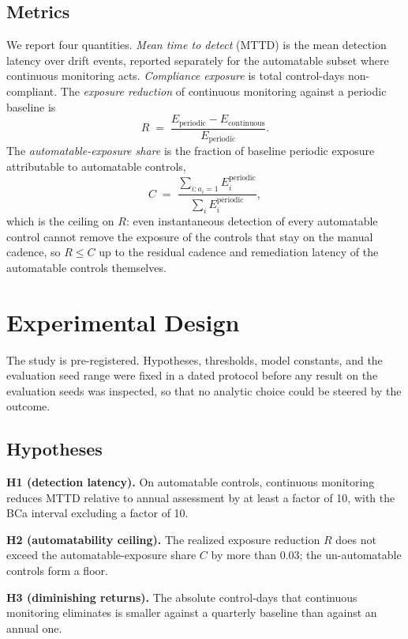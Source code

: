 \documentclass[journal]{IEEEtran}
\begin{document}
\subsection{Metrics}
We report four quantities. \emph{Mean time to detect} (MTTD) is the mean detection latency over
drift events, reported separately for the automatable subset where continuous monitoring acts.
\emph{Compliance exposure} is total control-days non-compliant. The \emph{exposure reduction} of
continuous monitoring against a periodic baseline is
\begin{equation}
R \;=\; \frac{E_{\text{periodic}} - E_{\text{continuous}}}{E_{\text{periodic}}}.
\end{equation}
The \emph{automatable-exposure share} is the fraction of baseline periodic exposure attributable to
automatable controls,
\begin{equation}
C \;=\; \frac{\sum_{i : a_i = 1} E_i^{\text{periodic}}}{\sum_{i} E_i^{\text{periodic}}},
\end{equation}
which is the ceiling on $R$: even instantaneous detection of every automatable control cannot remove
the exposure of the controls that stay on the manual cadence, so $R \le C$ up to the residual
cadence and remediation latency of the automatable controls themselves.

\section{Experimental Design}
The study is pre-registered. Hypotheses, thresholds, model constants, and the evaluation seed range
were fixed in a dated protocol before any result on the evaluation seeds was inspected, so that no
analytic choice could be steered by the outcome.

\subsection{Hypotheses}
\textbf{H1 (detection latency).} On automatable controls, continuous monitoring reduces MTTD
relative to annual assessment by at least a factor of 10, with the BCa interval excluding a factor
of 10.

\textbf{H2 (automatability ceiling).} The realized exposure reduction $R$ does not exceed the
automatable-exposure share $C$ by more than 0.03; the un-automatable controls form a floor.

\textbf{H3 (diminishing returns).} The absolute control-days that continuous monitoring eliminates
is smaller against a quarterly baseline than against an annual one.
\end{document}
